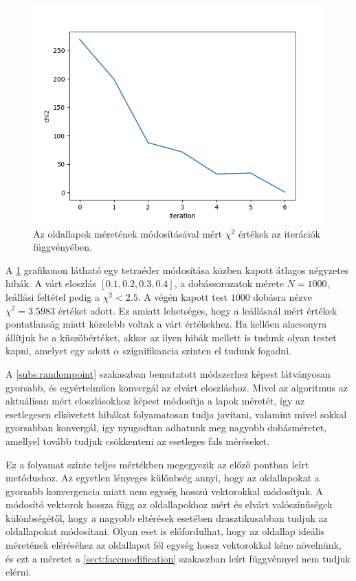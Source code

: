 \begin{figure}[h!]
	\centering
	\includegraphics[scale=0.7]{images/facemodify_chi2.png}
	\caption{Az oldallapok méretének módosításával mért $\chi^2$ értékek az iterációk függvényében.}
	\label{fig:facemodify_chi2}
\end{figure}

A \ref{fig:facemodify_chi2} grafikonon látható egy tetraéder módosítása közben kapott átlagos négyzetes hibák.
A várt eloszlás $[0.1, 0.2, 0.3, 0.4]$, a dobássorozatok mérete $N=1000$, leállási feltétel pedig a $\chi^2 < 2.5$.
A végén kapott test $1000$ dobásra nézve $\chi^2 = 3.5983$ értéket adott.
Ez amiatt lehetséges, hogy a leállásnál mért értékek pontatlanság miatt közelebb voltak a várt értékekhez.
Ha kellően alacsonyra állítjuk be a küszöbértéket, akkor az ilyen hibák mellett is tudunk olyan testet kapni, amelyet egy adott $\alpha$ szignifikancia szinten el tudunk fogadni.

A \ref{subs:randompoint} szakaszban bemutatott módszerhez képest látványosan gyorsabb, és egyértelműen konvergál az elvárt eloszláshoz.
Mivel az algoritmus az aktuálisan mért eloszlásokhoz képest módosítja a lapok méretét, így az esetlegesen elkövetett hibákat folyamatosan tudja javítani, valamint mivel sokkal gyorsabban konvergál, így nyugodtan adhatunk meg nagyobb dobásméretet, amellyel tovább tudjuk csökkenteni az esetleges fals méréseket.

\label{sect:ratiomodification}

Ez a folyamat szinte teljes mértékben megegyezik az előző pontban leírt metódushoz.
Az egyetlen lényeges különbség annyi, hogy az oldallapokat a gyorsabb konvergencia miatt nem egység hosszú vektorokkal módosítjuk.
A módosító vektorok hossza függ az oldallapokhoz mért és elvárt valószínűségek különbségétől, hogy a nagyobb eltérések esetében drasztikusabban tudjuk az oldallapokat módosítani.
Olyan eset is előfordulhat, hogy az oldallap ideális méretének eléréséhez az oldallapot fél egység hossz vektorokkal kéne növelnünk, és ezt a méretet a \ref{sect:facemodification} szakaszban leírt függvénnyel nem tudjuk elérni.

